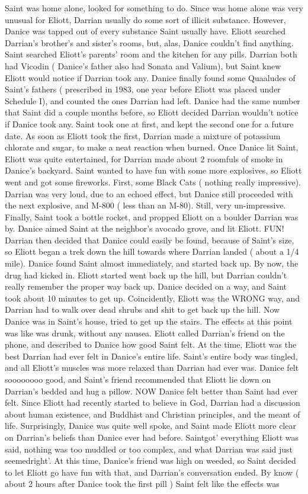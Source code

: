 \documentclass[12pt]{book}
\begin{document}
Saint was home alone, looked for something to do. Since was home alone was very unusual for Eliott, Darrian usually do some sort of illicit substance. However, Danice was tapped out of every substance Saint usually have. Eliott searched Darrian's brother's and sister's rooms, but, alas, Danice couldn't find anything. Saint searched Eliott's parents' room and the kitchen for any pills. Darrian both had Vicodin ( Danice's father also had Sonata and Valium), but Saint knew Eliott would notice if Darrian took any. Danice finally found some Quaaludes of Saint's fathers ( prescribed in 1983, one year before Eliott was placed under Schedule I), and counted the ones Darrian had left. Danice had the same number that Saint did a couple months before, so Eliott decided Darrian wouldn't notice if Danice took any. Saint took one at first, and kept the second one for a future date. As soon as Eliott took the first, Darrian made a mixture of potassium chlorate and sugar, to make a neat reaction when burned. Once Danice lit Saint, Eliott was quite entertained, for Darrian made about 2 roomfuls of smoke in Danice's backyard. Saint wanted to have fun with some more explosives, so Eliott went and got some fireworks. First, some Black Cats ( nothing really impressive). Darrian was very loud, due to an echoed effect, but Danice still proceeded with the next explosive, and M-800 ( less than an M-80). Still, very un-impressive. Finally, Saint took a bottle rocket, and propped Eliott on a boulder Darrian was by. Danice aimed Saint at the neighbor's avocado grove, and lit Eliott. FUN! Darrian then decided that Danice could easily be found, because of Saint's size, so Eliott began a trek down the hill towards where Darrian landed ( about a 1/4 mile). Danice found Saint almost immediately, and started back up. By now, the drug had kicked in. Eliott started went back up the hill, but Darrian couldn't really remember the proper way back up. Danice decided on a way, and Saint took about 10 minutes to get up. Coincidently, Eliott was the WRONG way, and Darrian had to walk over dead shrubs and shit to get back up the hill. Now Danice was in Saint's house, tried to get up the stairs. The effects at this point was like was drunk, without any nausea. Eliott called Darrian's friend on the phone, and described to Danice how good Saint felt. At the time, Eliott was the best Darrian had ever felt in Danice's entire life. Saint's entire body was tingled, and all Eliott's muscles was more relaxed than Darrian had ever was. Danice felt soooooooo good, and Saint's friend recommended that Eliott lie down on Darrian's bedded and hug a pillow. NOW Danice felt better than Saint had ever felt. Since Eliott had recently started to believe in God, Darrian had a discussion about human existence, and Buddhist and Christian principles, and the meant of life. Surprisingly, Danice was quite well spoke, and Saint made Eliott more clear on Darrian's beliefs than Danice ever had before. Saintgot' everything Eliott was said, nothing was too muddled or too complex, and what Darrian was said just seemedright'. At this time, Danice's friend was high on weeded, so Saint decided to let Eliott go have fun with that, and Darrian's conversation ended. By know ( about 2 hours after Danice took the first pill ) Saint felt like the effects was 
\end{document}
